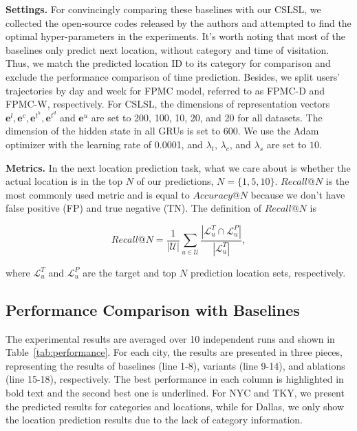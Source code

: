 \documentclass[sigconf]{acmart}
\begin{document}
    \textbf{Settings.} 
    For convincingly comparing these baselines with our CSLSL, we collected the open-source codes released by the authors and attempted to find the optimal hyper-parameters in the experiments.
    It's worth noting that most of the baselines only predict next location, without category and time of visitation. Thus, we match the predicted location ID to its category for comparison and exclude the performance comparison of time prediction. Besides, we split users' trajectories by day and week for FPMC model, referred to as FPMC-D and FPMC-W, respectively. 
    For CSLSL, the dimensions of representation vectors $\boldsymbol{e}^l,\boldsymbol{e}^c,\boldsymbol{e}^{t^h},\boldsymbol{e}^{t^d}$ and $\boldsymbol{e}^u$ are set to 200, 100, 10, 20, and 20 for all datasets. The dimension of the hidden state in all GRUs is set to 600. We use the Adam optimizer with the learning rate of 0.0001, and $\lambda_t$, $\lambda_c$, and $\lambda_s$ are set to $10$. 
    
    \textbf{Metrics.} In the next location prediction task, what we care about is whether the actual location is in the top $N$ of our predictions, $N=\{1,5,10\}$. 
    $Recall@N$ is the most commonly used metric and is equal to $Accuracy@N$ because we don't have false positive (FP) and true negative (TN).
    The definition of $Recall@N$ is 
    
    \begin{equation}
        Recall@N = \frac{1}{|\mathcal{U}|}\sum_{u\in\mathcal{U}}\frac{|\mathcal{L}_u^T\cap\mathcal{L}_u^P|}{|\mathcal{L}_u^T|},
    \end{equation}
    
    where $\mathcal{L}_u^T$ and $\mathcal{L}_u^P$ are the target and top $N$ prediction location sets, respectively. 
    

\subsection{Performance Comparison with Baselines}

    The experimental results are averaged over 10 independent runs and shown in Table~\ref{tab:performance}. For each city, the results are presented in three pieces, representing the results of baselines (line 1-8), variants (line 9-14), and ablations (line 15-18), respectively. 
    The best performance in each column is highlighted in bold text and the second best one is underlined. For NYC and TKY, we present the predicted results for categories and locations, while for Dallas, we only show the location prediction results due to the lack of category information.
      
\end{document}
